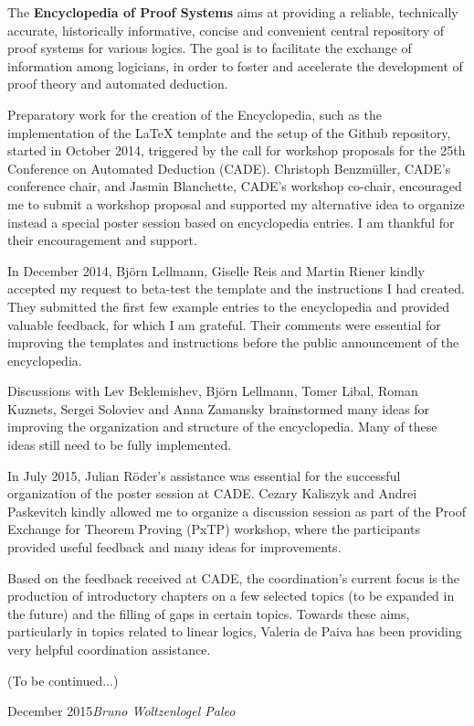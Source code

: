 
\preface

The \textbf{Encyclopedia of Proof Systems} aims at providing a reliable, technically accurate, historically informative, concise and convenient central repository of proof systems for various logics. The goal is to facilitate the exchange of information among logicians, in order to foster and accelerate the development of proof theory and automated deduction.

Preparatory work for the creation of the Encyclopedia, such as the implementation of the LaTeX template and the setup of the Github repository, started in October 2014, triggered by the call for workshop proposals for the 25th Conference on Automated Deduction (CADE). Christoph Benzm\"uller, CADE's conference chair, and Jasmin Blanchette, CADE's workshop co-chair, encouraged me to submit a workshop proposal and supported my alternative idea to organize instead a special poster session based on encyclopedia entries. I am thankful for their encouragement and support.

In December 2014, Bj\"orn Lellmann, Giselle Reis and Martin Riener kindly accepted my request to beta-test the template and the instructions I had created. They submitted the first few example entries to the encyclopedia and provided valuable feedback, for which I am grateful. Their comments were essential for improving the templates and instructions before the public announcement of the encyclopedia.

Discussions with Lev Beklemishev, Bj\"orn Lellmann, Tomer Libal, Roman Kuznets, Sergei Soloviev and Anna Zamansky brainstormed many ideas for improving the organization and structure of the encyclopedia. Many of these ideas still need to be fully implemented.

In July 2015, Julian R\"oder's assistance was essential for the successful organization of the poster session at CADE. Cezary Kaliszyk and Andrei Paskevitch kindly allowed me to organize a discussion session as part of the Proof Exchange for Theorem Proving (PxTP) workshop, where the participants provided useful feedback and many ideas for improvements.

Based on the feedback received at CADE, the coordination's current focus is the production of introductory chapters on a few selected topics (to be expanded in the future) and the filling of gaps in certain topics. Towards these aims, particularly in topics related to linear logics, Valeria de Paiva has been providing very helpful coordination assistance.

(To be continued...)


\vspace{\baselineskip}
\begin{flushright}\noindent
December 2015\hfill {\it Bruno Woltzenlogel Paleo}
\end{flushright}


